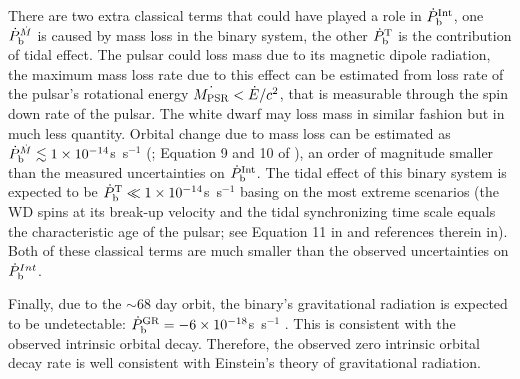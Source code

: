 There are two extra classical terms that could have played a role in
$\dot{P}_{\rm b}^{\rm Int}$, one $\dot{P}_{\rm b}^{\dot{M}}$ is caused by mass loss in the
binary system, the other $ \dot{P}_{\rm b}^{\rm T}$ is the contribution of tidal effect.
The pulsar could loss mass due to its magnetic dipole radiation, the maximum
mass loss rate due to this effect can be estimated from loss rate of the
pulsar's rotational energy $\dot{M_{\rm PSR}}<\dot{E}/c^2$, that is
measurable through the spin down rate of the pulsar.
The white dwarf may loss mass in similar fashion but in much less quantity.
Orbital change due to mass loss can be estimated as $\dot{P}_{\rm
b}^{\dot{M}}\lesssim 1\times10^{-14}$s~s$^{-1}$ (\citealt{dt91}; Equation 9 and 10
of \citealt{fwe+12}), an order of magnitude smaller than the measured
uncertainties on $\dot{P}_{\rm b}^{\rm Int}$.
The tidal effect of this binary system is expected to be $\dot{P}_{\rm b}^{\rm
T}\ll1\times10^{-14}$s~s$^{-1}$ basing on the most extreme scenarios (the WD spins at its break-up velocity and the tidal synchronizing time scale equals the
characteristic age of the pulsar; see Equation 11 in \citealt{fwe+12} and
references therein in).
Both of these classical terms are much smaller than the observed uncertainties
on $\dot{P}_{\rm b}^{Int}$.


Finally, due to the $\sim$68 day orbit, the binary's gravitational 
radiation is expected to be undetectable: 
$\dot{P}_{\rm b}^{\rm GR} = -6\times10^{-18}$s~s$^{-1}$ \citep{lk05}.
This is consistent with the observed intrinsic orbital decay. Therefore,
the observed zero intrinsic orbital decay rate is well consistent with
Einstein's theory of gravitational radiation.


